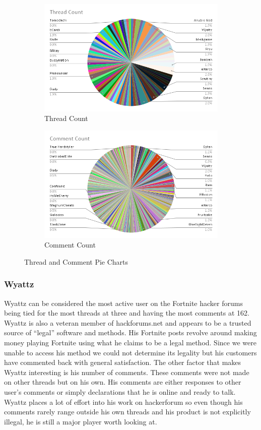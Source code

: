 \documentclass[sigconf]{acmart}
\begin{document}
\begin{figure}
\centering
\begin{subfigure}{.5\textwidth}
 	\centering
	\includegraphics[width = .4\linewidth]{ThreadCount.png}
	\caption{Thread Count}
\end{subfigure}%
\begin{subfigure}{.5\textwidth}
 	\centering
	\includegraphics[width=.4\linewidth]{CommentCount.png}
	\caption{Comment Count}
\end{subfigure}
\caption{Thread and Comment Pie Charts}
\end{figure}


\subsubsection{Wyattz}
Wyattz can be considered the most active user on the Fortnite hacker forums being tied for the most threads at three and having the most comments at 162. Wyattz is also a veteran member of hackforums.net and appears to be a trusted source of “legal” software and methods. His Fortnite posts revolve around making money playing Fortnite using what he claims to be a legal method. Since we were unable to access his method we could not determine its legality but his customers have commented back with general satisfaction. The other factor that makes Wyattz interesting is his number of comments. These comments were not made on other threads but on his own. His comments are either responses to other user’s comments or simply declarations that he is online and ready to talk. Wyattz places a lot of effort into his work on hackerforum so even though his comments rarely range outside his own threads and his product is not explicitly illegal, he is still a major player worth looking at.
\end{document}
